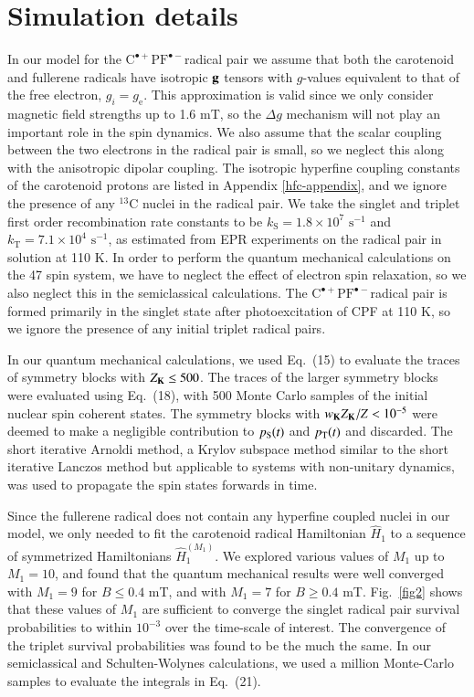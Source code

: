 \documentclass[%
aip,
jcp,%
amsmath,amssymb,
reprint%
]{revtex4-1}
\newcommand{\sing}{\ensuremath{\mathrm{S}}}
\newcommand{\trip}{\ensuremath{\mathrm{T}}}
\renewcommand{\op}[1]{\ensuremath{\hat{#1}}}
\newcommand{\CPFrp}{$\text{C}^{\bullet +}\text{PF}^{\bullet-}$}
\begin{document}
\section{Simulation details}\label{cpf-sim-sec}

In our model for the \CPFrp radical pair we assume that both the carotenoid and fullerene radicals have isotropic $\vb{g}$ tensors with $g$-values equivalent to that of the free electron, $g_i = g_\mathrm{e}$. This approximation is valid since we only consider magnetic field strengths up to 1.6 mT, so the $\Delta g$ mechanism will not play an important role in the spin dynamics. We also assume that the scalar coupling between the two electrons in the radical pair is small, so we neglect this along with the anisotropic dipolar coupling. The isotropic hyperfine coupling constants of the carotenoid protons are listed in Appendix \ref{hfc-appendix}, and we ignore the presence of any ${}^{13}\text{C}$ nuclei in the radical pair. We take the singlet and triplet first order recombination rate constants to be $k_\sing = 1.8\times 10^{7}\text{ s}^{-1}$ and $k_\trip = 7.1\times 10^{4}\text{ s}^{-1}$, as estimated from EPR experiments on the radical pair in solution at 110 K.\cite{Maeda2011} In order to perform the quantum mechanical calculations on the 47 spin system, we have to neglect the effect of electron spin relaxation, so we also neglect this in the semiclassical calculations. The \CPFrp radical pair is formed primarily in the singlet state after photoexcitation of CPF at 110 K,\cite{Maeda2011} so we ignore the presence of any initial triplet radical pairs.

In our quantum mechanical calculations, we used Eq.~(15) to evaluate the traces of symmetry blocks with $Z_{\bf K}\le 500$. The traces of the larger symmetry blocks were evaluated using Eq.~(18), with 500 Monte Carlo samples of the initial nuclear spin coherent states.\cite{Lewis2016} The symmetry blocks with $w_{\bf K}Z_{\bf K}/Z<10^{-5}$ were deemed to make a negligible contribution to $p_{\rm S}(t)$ and $p_{\rm T}(t)$ and discarded. The short iterative Arnoldi method, a Krylov subspace method similar to the short iterative Lanczos method\cite{Park1986} but applicable to systems with non-unitary dynamics, was used to propagate the spin states forwards in time.

Since the fullerene radical does not contain any hyperfine coupled nuclei in our model, we only needed to fit the carotenoid radical Hamiltonian $\hat{H}_1$ to a sequence of symmetrized Hamiltonians $\op{H}^{(M_1)}_1$. We explored various values of $M_1$ up to $M_1=10$, and found that the quantum mechanical results were well converged with $M_1=9$ for $B\le 0.4$ mT, and with $M_1=7$ for $B\ge 0.4$ mT.  Fig.~\ref{fig2} shows that these values of $M_1$ are sufficient to converge the singlet radical pair survival probabilities to within $10^{-3}$ over the time-scale of interest. The convergence of the triplet survival probabilities was found to be the much the same. In our semiclassical and Schulten-Wolynes calculations, we used a million Monte-Carlo samples to evaluate the integrals in Eq.~(21).
\end{document}
